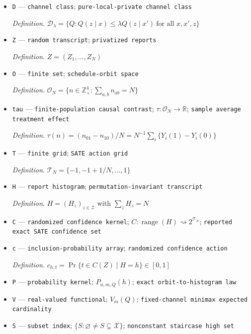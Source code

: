 \documentclass{article}
\begin{document}
\begin{itemize}
  \item \texttt{D} --- \texttt{channel class}; \texttt{pure-\allowbreak{}local-\allowbreak{}private channel class}
  \par\smallskip\noindent\emph{Definition.} \(\mathcal D_\lambda=\{Q:Q(z\mid x)\le\lambda Q(z\mid x')\ \text{for all }x,x',z\}\)
  \item \texttt{Z} --- \texttt{random transcript}; \texttt{privatized reports}
  \par\smallskip\noindent\emph{Definition.} \(Z=(Z_1,\ldots,Z_N)\)
  \item \texttt{O} --- \texttt{finite set}; \texttt{schedule-\allowbreak{}orbit space}
  \par\smallskip\noindent\emph{Definition.} \(\mathcal O_N=\{n\in\mathbb Z_+^4:\sum_{a,b}n_{ab}=N\}\)
  \item \texttt{tau} --- \texttt{finite-\allowbreak{}population causal contrast}; \(\tau:\mathcal O_N\to\mathbb R\); \texttt{sample average treatment effect}
  \par\smallskip\noindent\emph{Definition.} \(\tau(n)=(n_{01}-n_{10})/N=N^{-1}\sum_i\{Y_i(1)-Y_i(0)\}\)
  \item \texttt{T} --- \texttt{finite grid}; \texttt{SATE action grid}
  \par\smallskip\noindent\emph{Definition.} \(\mathcal T_N=\{-1,-1+1/N,\ldots,1\}\)
  \item \texttt{H} --- \texttt{report histogram}; \texttt{permutation-\allowbreak{}invariant transcript}
  \par\smallskip\noindent\emph{Definition.} \(H=(H_z)_{z\in\mathcal Z}\) with \(\sum_zH_z=N\)
  \item \texttt{C} --- \texttt{randomized confidence kernel}; \(C:\operatorname{range}(H)\rightsquigarrow2^{\mathcal T_N}\); \texttt{reported exact SATE confidence set}
  \item \texttt{c} --- \texttt{inclusion-\allowbreak{}probability array}; \texttt{randomized confidence action}
  \par\smallskip\noindent\emph{Definition.} \(c_{h,t}=\Pr\{t\in C(Z)\mid H=h\}\in[0,1]\)
  \item \texttt{P} --- \texttt{probability kernel}; \(P_{n,m,Q}(h)\); \texttt{exact orbit-\allowbreak{}to-\allowbreak{}histogram law}
  \item \texttt{V} --- \texttt{real-\allowbreak{}valued functional}; \(V_m(Q)\); \texttt{fixed-\allowbreak{}channel minimax expected cardinality}
  \item \texttt{S} --- \texttt{subset index}; \(\{S:\varnothing\ne S\subsetneq\mathcal X\}\); \texttt{nonconstant staircase high set}

\end{itemize}
\end{document}
